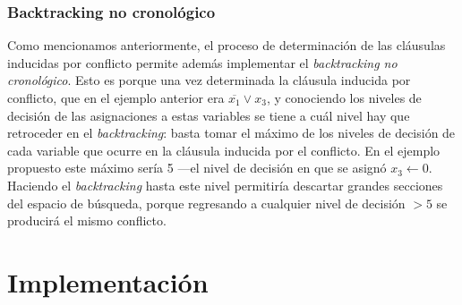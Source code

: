 \documentclass[12pt,lettersize,oneside]{article}
\begin{document}
\subsubsection{Backtracking no cronológico}
Como mencionamos anteriormente, el proceso de determinación de las cláusulas
inducidas por conflicto permite además implementar el \emph{backtracking no
  cronológico}. Esto es porque una vez determinada la cláusula inducida por
conflicto, que en el ejemplo anterior era $\overline{x_1} \vee x_3$, y
conociendo los niveles de decisión de las asignaciones a estas variables se
tiene a cuál nivel hay que retroceder en el \emph{backtracking}: basta tomar el
máximo de los niveles de decisión de cada variable que ocurre en la cláusula
inducida por el conflicto. En el ejemplo propuesto este máximo sería 5 ---el
nivel de decisión en que se asignó $x_3 \gets 0$. Haciendo el
\emph{backtracking} hasta este nivel permitiría descartar grandes secciones del
espacio de búsqueda, porque regresando a cualquier nivel de decisión $>5$ se
producirá el mismo conflicto.


\section{Implementación}
\end{document}
